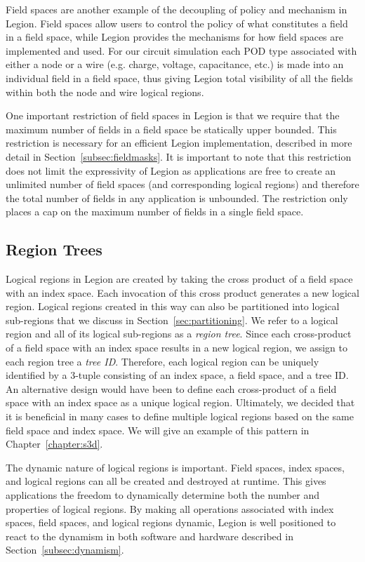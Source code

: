 Field spaces are another example of the decoupling
of policy and mechanism in Legion. Field spaces
allow users to control the policy of what
constitutes a field in a field space, while
Legion provides the mechanisms for how field
spaces are implemented and used.  For our circuit 
simulation each POD type associated with either a node
or a wire (e.g. charge, voltage, capacitance, etc.)
is made into an individual field in a field space, 
thus giving Legion total visibility of all the fields 
within both the node and wire logical regions.

One important restriction of field spaces in
Legion is that we require that the maximum number
of fields in a field space be statically upper
bounded. This restriction is necessary for an
efficient Legion implementation, described 
in more detail in Section~\ref{subsec:fieldmasks}.
It is important to note that this restriction does
not limit the expressivity of Legion as applications
are free to create an unlimited number of field spaces
(and corresponding logical regions) and therefore the
total number of fields in any application is unbounded.
The restriction only places a cap on the maximum number
of fields in a single field space.

\subsection{Region Trees}
\label{subsec:trees}
Logical regions in Legion are created by taking
the cross product of a field space with an index
space. Each invocation of this cross product generates 
a new logical region. Logical regions created in 
this way can also be partitioned into logical sub-regions
that we discuss in Section~\ref{sec:partitioning}. We refer 
to a logical region and all of its logical sub-regions as 
a {\em region tree}. Since each cross-product of a
field space with an index space results in a new
logical region, we assign to each region tree a 
{\em tree ID}. Therefore, each logical region can be
uniquely identified by a 3-tuple consisting of 
an index space, a field space, and a tree ID. An
alternative design would have been to define
each cross-product of a field space with an 
index space as a unique logical region. Ultimately, we
decided that it is beneficial in many cases
to define multiple logical regions based on the
same field space and index space. We will give an
example of this pattern in Chapter~\ref{chapter:s3d}.

The dynamic nature of logical regions is important.
Field spaces, index spaces, and logical regions can
all be created and destroyed at runtime.  This gives 
applications the freedom to dynamically determine
both the number and properties of logical regions.
By making all operations associated with index spaces,
field spaces, and logical regions dynamic, Legion is well
positioned to react to the dynamism in both software
and hardware described in Section~\ref{subsec:dynamism}.


